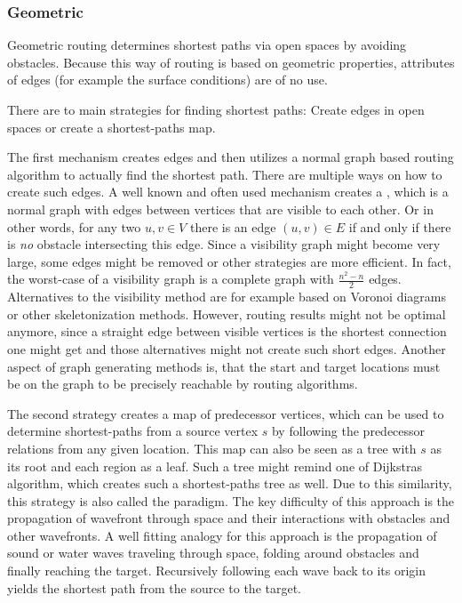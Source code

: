		
		\subsubsection{Geometric}
		\label{subsubsec:geometric-routing}
		
			Geometric routing determines shortest paths via open spaces by avoiding obstacles.
			Because this way of routing is based on geometric properties, attributes of edges (for example the surface conditions) are of no use.
			
			
			There are to main strategies for finding shortest paths:
			Create edges in open spaces or create a shortest-paths map.
			
			The first mechanism creates edges and then utilizes a normal graph based routing algorithm to actually find the shortest path.
			There are multiple ways on how to create such edges.
			A well known and often used mechanism creates a , which is a normal graph with edges between vertices that are visible to each other.
			Or in other words, for any two $u, v \in V$ there is an edge $(u, v) \in E$ if and only if there is \textit{no} obstacle intersecting this edge.
			Since a visibility graph might become very large, some edges might be removed or other strategies are more efficient.
			In fact, the worst-case of a visibility graph is a complete graph with $\frac{n^2 - n}{2}$ edges.
			Alternatives to the visibility method are for example based on Voronoi diagrams or other skeletonization methods\cite[219-220]{graser-osm-open-spaces}.
			However, routing results might not be optimal anymore, since a straight edge between visible vertices is the shortest connection one might get and those alternatives might not create such short edges\cite[223]{graser-osm-open-spaces}.
			Another aspect of graph generating methods is, that the start and target locations must be on the graph to be precisely reachable by routing algorithms.
			
			The second strategy creates a map of predecessor vertices, which can be used to determine shortest-paths from a source vertex $s$ by following the predecessor relations from any given location.
			This map can also be seen as a tree with $s$ as its root and each region as a leaf.
			Such a tree might remind one of Dijkstras algorithm, which creates such a shortest-paths tree as well.
			Due to this similarity, this strategy is also called the  paradigm\cite[648]{mitchell-discrete-geodesic}.
			The key difficulty of this approach is the propagation of wavefront through space and their interactions with obstacles and other wavefronts\cite[3]{hershberger-suri}.
			A well fitting analogy for this approach is the propagation of sound or water waves traveling through space, folding around obstacles and finally reaching the target.
			Recursively following each wave back to its origin yields the shortest path from the source to the target.

